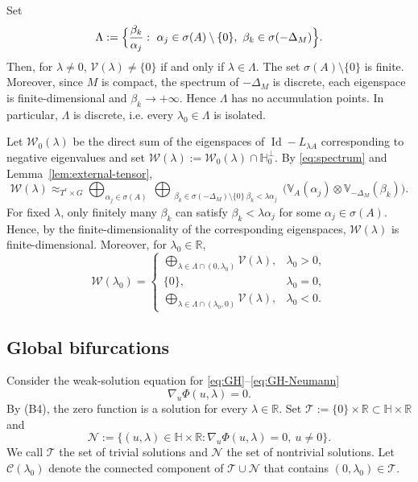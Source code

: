 \documentclass[reqno,twoside,12pt]{amsart}
\newcommand{\bH}{\mathbb{H}}
\newcommand{\bR}{\mathbb{R}}
\newcommand{\bV}{\mathbb{V}}
\newcommand{\cC}{\mathcal{C}}
\newcommand{\cN}{\mathcal{N}}
\newcommand{\cT}{\mathcal{T}}
\newcommand{\cV}{\mathcal{V}}
\newcommand{\cW}{\mathcal{W}}
\numberwithin{equation}{section} \errorcontextlines=0
\begin{document}
Set
\begin{equation}\label{eq:Lambda}
\Lambda:=\Bigl\{\frac{\beta_{k}}{\alpha_{j}}:\ \alpha_{j}\in\sigma(A)\setminus\{0\},\ \beta_{k}\in\sigma(-\Delta_{M}) \Bigr\}.
\end{equation}
Then, for $\lambda \neq 0$, $\cV(\lambda)\neq\{0\}$ if and only if $\lambda\in\Lambda$. The set $\sigma(A)\setminus\{0\}$ is finite. Moreover, since $M$ is compact, the spectrum of $-\Delta_M$ is discrete, each eigenspace is finite-dimensional and $\beta_k\to+\infty$. Hence $\Lambda$ has no accumulation points. In particular, $\Lambda$ is discrete, i.e. every $\lambda_0\in\Lambda$ is isolated.

Let $\cW_{0}(\lambda)$ be the direct sum of the eigenspaces of $\operatorname{Id}-L_{\lambda A}$ corresponding to negative eigenvalues and set $\cW(\lambda):=\cW_{0}(\lambda)\cap\bH_0^{\bot}$. By \eqref{eq:spectrum} and Lemma~\ref{lem:external-tensor},
\begin{equation*}\label{eq:cWlambda}
\cW(\lambda)\approx_{T^r\times G}
\bigoplus_{\alpha_{j}\in\sigma(A)}\ \bigoplus_{\substack{\beta_{k}\in\sigma(-\Delta_{M})\setminus\{0\}\ \beta_{k}<\lambda \alpha_{j}}}
\bigl(\bV_{A}(\alpha_{j})\otimes \bV_{-\Delta_{M}}(\beta_{k})\bigr).
\end{equation*}
For fixed $\lambda$, only finitely many $\beta_k$ can satisfy $\beta_k<\lambda\alpha_j$ for some $\alpha_j\in\sigma(A)$. Hence, by the finite-dimensionality of the corresponding eigenspaces, $\cW(\lambda)$ is finite-dimensional.
Moreover, for $\lambda_0\in\bR$,
\begin{equation}\label{eq:cW-piecewise}
\cW(\lambda_{0})=
\begin{cases}
\displaystyle \bigoplus\limits_{\lambda\in \Lambda\cap(0,\lambda_{0})} \cV(\lambda), & \lambda_{0}>0,\\
\{0\}, & \lambda_{0}=0,\\
\displaystyle \bigoplus\limits_{\lambda\in \Lambda\cap(\lambda_{0},0)} \cV(\lambda), & \lambda_{0}<0.
\end{cases}
\end{equation}


\subsection{Global bifurcations}\label{subsec:global}
Consider the weak-solution equation for \eqref{eq:GH}--\eqref{eq:GH-Neumann} \begin{equation}\label{eq:bifeq}
\nabla_u \Phi(u,\lambda)=0.
\end{equation}
By (B4), the zero function is a solution for every $\lambda\in\bR$. Set
$\cT:=\{0\}\times\bR\subset\bH\times\bR$
and
\[\cN:=\{(u,\lambda)\in\bH\times\bR: \nabla_u\Phi(u,\lambda)=0,\ u\neq 0\}.
\]
We call $\cT$ the set of trivial solutions and $\cN$ the set of nontrivial solutions. Let $\cC(\lambda_0)$ denote the connected component of $\cT\cup\cN$ that contains $(0,\lambda_0)\in\cT$.
\end{document}
